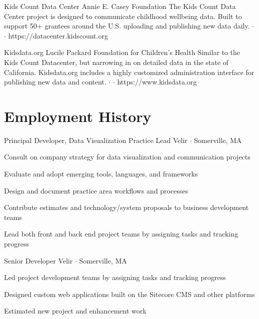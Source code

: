 \documentclass{article}
\begin{document}
{Kids Count Data Center}
{Annie E. Casey Foundation}
{
  The Kids Count Data Center project is designed to communicate childhood wellbeing data. Built to support 50+ grantees around the U.S. uploading and publishing new data daily.
  $\cdot$  
  $\cdot$ https://datacenter.kidscount.org
}

{Kidsdata.org}
{Lucile Packard Foundation for Children's Health}
{
  Similar to the Kids Count Datacenter, but narrowing in on detailed data in the state of California. Kidsdata.org includes a highly customized administration interface for publishing new data and content.
  $\cdot$  
  $\cdot$ https://www.kidsdata.org
}


\section{Employment History}

{Principal Developer, Data Visualization Practice Lead}
{Velir $\cdot$ Somerville, MA}
{
  \begin{compactitem}
    \item Consult on company strategy for data visualization and communication projects
    \item Evaluate and adopt emerging tools, languages, and frameworks
    \item Design and document practice area workflows and processes
    \item Contribute estimates and technology/system proposals to business development teams
    \item Lead both front and back end project teams by assigning tasks and tracking progress
  \end{compactitem}
}

{Senior Developer}
{Velir $\cdot$ Somerville, MA}
{
  \begin{compactitem}
    \item Led project development teams by assigning tasks and tracking progress
    \item Designed custom web applications built on the Sitecore CMS and other platforms
    \item Estimated new project and enhancement work
  \end{compactitem}
}
\end{document}
